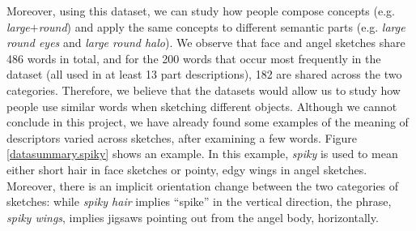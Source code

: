 Moreover, using this dataset, we can study how people compose concepts (e.g. \textit{large}$+$\textit{round}) and apply the same concepts to different semantic parts (e.g. \textit{large round eyes} and \textit{large round halo}).     
We observe that face and angel sketches share 486 words in total, and for the 200 words that occur most frequently in the dataset (all used in at least 13 part descriptions), 182 are shared across the two categories. Therefore, we believe that the datasets would allow us to study how people use similar words when sketching different objects. Although we cannot conclude in this project, we have already found some examples of the meaning of descriptors varied across sketches, after examining a few words. Figure \ref{datasummary.spiky} shows an example. In this example, \textit{spiky} is used to mean either short hair in face sketches or pointy, edgy wings in angel sketches. Moreover, there is an implicit orientation change between the two categories of sketches: while \textit{spiky hair} implies ``spike'' in the vertical direction, the phrase, \textit{spiky wings}, implies jigsaws pointing out from the angel body, horizontally.   

